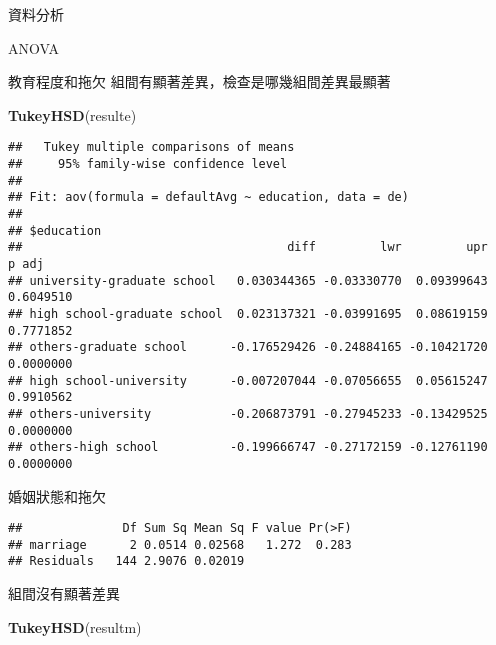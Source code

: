 \documentclass[ignorenonframetext,]{beamer}
\newenvironment{Shaded}{\begin{snugshade}}{\end{snugshade}}
\newcommand{\KeywordTok}[1]{\textcolor[rgb]{0.13,0.29,0.53}{\textbf{#1}}}
\newcommand{\DataTypeTok}[1]{\textcolor[rgb]{0.13,0.29,0.53}{#1}}
\newcommand{\StringTok}[1]{\textcolor[rgb]{0.31,0.60,0.02}{#1}}
\newcommand{\OperatorTok}[1]{\textcolor[rgb]{0.81,0.36,0.00}{\textbf{#1}}}
\newcommand{\NormalTok}[1]{#1}
\begin{document}
\begin{frame}[fragile]{資料分析}
\begin{block}{ANOVA}
\begin{block}{教育程度和拖欠}
組間有顯著差異，檢查是哪幾組間差異最顯著

\begin{Shaded}
\begin{Highlighting}[]
\KeywordTok{TukeyHSD}\NormalTok{(resulte)}
\end{Highlighting}
\end{Shaded}

\begin{verbatim}
##   Tukey multiple comparisons of means
##     95% family-wise confidence level
## 
## Fit: aov(formula = defaultAvg ~ education, data = de)
## 
## $education
##                                     diff         lwr         upr     p adj
## university-graduate school   0.030344365 -0.03330770  0.09399643 0.6049510
## high school-graduate school  0.023137321 -0.03991695  0.08619159 0.7771852
## others-graduate school      -0.176529426 -0.24884165 -0.10421720 0.0000000
## high school-university      -0.007207044 -0.07056655  0.05615247 0.9910562
## others-university           -0.206873791 -0.27945233 -0.13429525 0.0000000
## others-high school          -0.199666747 -0.27172159 -0.12761190 0.0000000
\end{verbatim}

\end{block}

\begin{block}{婚姻狀態和拖欠}

\begin{Shaded}
\end{Shaded}

\begin{verbatim}
##              Df Sum Sq Mean Sq F value Pr(>F)
## marriage      2 0.0514 0.02568   1.272  0.283
## Residuals   144 2.9076 0.02019
\end{verbatim}

組間沒有顯著差異

\begin{Shaded}
\begin{Highlighting}[]
\KeywordTok{TukeyHSD}\NormalTok{(resultm)}
\end{Highlighting}
\end{Shaded}


\end{block}
\end{block}
\end{frame}
\end{document}
